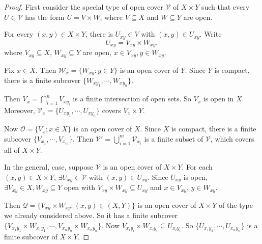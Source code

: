 \documentclass[a4paper]{article}
\begin{document}
\begin{proof}
  First consider the special type of open cover $\mathcal{V}$ of $X\times Y$ such that every $U\in \mathcal{V}$ has the form $U = V\times W$, where $V\subseteq X$ and $W\subseteq Y$ are open.

  For every $(x, y) \in X\times Y$, there is $U_{xy}\in V$ with $(x, y)\in U_{xy}$. Write
  \[
    U_{xy} = V_{xy}\times W_{xy},
  \]
  where $V_{xy}\subseteq X$, $W_{xy}\subseteq Y$ are open, $x\in V_{xy}, y\in W_{xy}$.

  Fix $x\in X$. Then $\mathcal{W}_x = \{W_{xy}: y\in Y\}$ is an open cover of $Y$. Since $Y$ is compact, there is a finite subcover $\{W_{xy_1}, \cdots, W_{xy_n}\}$.

  Then $V_x = \bigcap_{i = 1}^n V_{xy_i}$ is a finite intersection of open sets. So $V_x$ is open in $X$. Moreover, $\mathcal{V}_x = \{U_{xy_1},\cdots , U_{xy_n}\}$ covers $V_x \times Y$.
  \begin{center}
  \end{center}
  Now $\mathcal{O} = \{V_x: x\in X\}$ is an open cover of $X$. Since $X$ is compact, there is a finite subcover $\{V_{x_1}, \cdots, V_{x_m}\}$. Then $\mathcal{V}' = \bigcup_{i = 1}^m \mathcal{V}_{x_i}$ is a finite subset of $\mathcal{V}$, which covers all of $X\times Y$.

  In the general, case, suppose $\mathcal{V}$ is an open cover of $X\times Y$. For each $(x, y) \in X\times Y$, $\exists U_{xy}\in \mathcal{V}$ with $(x, y)\in U_{xy}$. Since $U_{xy}$ is open, $\exists V_{xy}\in X, W_{xy}\subseteq Y$ open with $V_{xy}\times W_{xy}\subseteq U_{xy}$ and $x\in V_{xy}$, $y\in W_{xy}$.

  Then $\mathcal{Q} = \{V_{xy}\times W_{xy}: (x, y)\in (X, Y)\}$ is an open cover of $X\times Y$ of the type we already considered above. So it has a finite subcover $\{V_{x_1y_1}\times W_{x_1y_1}, \cdots, V_{x_n y_n}\times W_{x_n y_n}\}$. Now $V_{x_iy_i} \times W_{x_iy_i} \subseteq U_{x_iy_i}$. So $\{U_{x_1y_1},\cdots,  U_{x_n y_n}\}$ is a finite subcover of $X\times Y$.
\end{proof}
\end{document}
